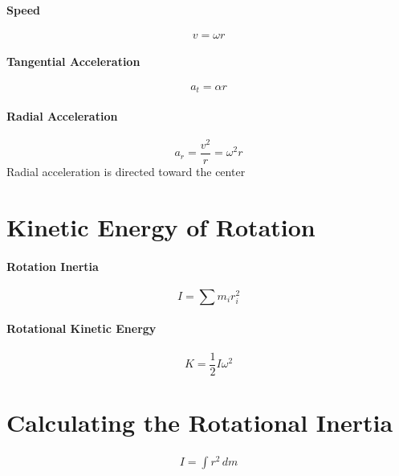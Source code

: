 \documentclass{article}
\begin{document}
        \paragraph{Speed}
        \begin{equation}
            v = \omega r
        \end{equation}

        \paragraph{Tangential Acceleration}
        \begin{equation}
            a_t = \alpha r
        \end{equation}

        \paragraph{Radial Acceleration}
        \begin{equation}
            a_r = \frac{v^2}{r} = \omega^2 r
        \end{equation}
        Radial acceleration is directed toward the center

    \section{Kinetic Energy of Rotation}

        \paragraph{Rotation Inertia}
        \begin{equation}
            I = \sum m_i r_i^2
        \end{equation}

        \paragraph{Rotational Kinetic Energy}
        \begin{equation}
            K = \frac{1}{2} I \omega^2
        \end{equation}

    \section{Calculating the Rotational Inertia}

        \begin{eqnarray}
            I = \int r^2 \, dm
        \end{eqnarray}
\end{document}
